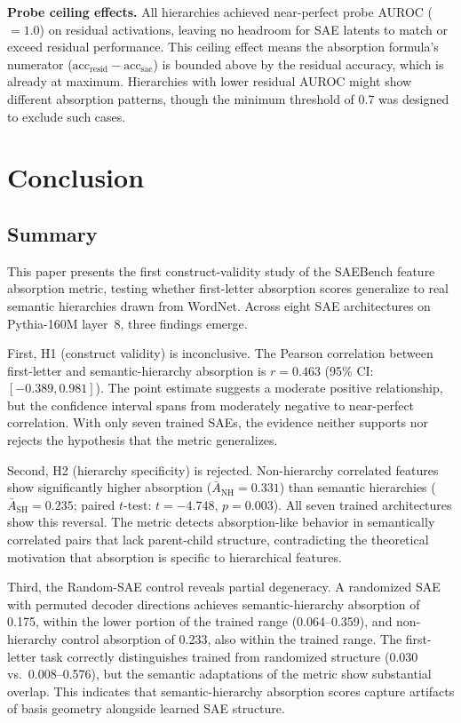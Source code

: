 \documentclass{article}
\begin{document}
\textbf{Probe ceiling effects.} All hierarchies achieved near-perfect probe AUROC ($= 1.0$) on residual activations, leaving no headroom for SAE latents to match or exceed residual performance. This ceiling effect means the absorption formula's numerator ($\text{acc}_{\text{resid}} - \text{acc}_{\text{sae}}$) is bounded above by the residual accuracy, which is already at maximum. Hierarchies with lower residual AUROC might show different absorption patterns, though the minimum threshold of 0.7 was designed to exclude such cases.

\section{Conclusion}

\subsection{Summary}

This paper presents the first construct-validity study of the SAEBench feature absorption metric, testing whether first-letter absorption scores generalize to real semantic hierarchies drawn from WordNet. Across eight SAE architectures on Pythia-160M layer~8, three findings emerge.

First, H1 (construct validity) is inconclusive. The Pearson correlation between first-letter and semantic-hierarchy absorption is $r = 0.463$ (95\% CI: $[-0.389, 0.981]$). The point estimate suggests a moderate positive relationship, but the confidence interval spans from moderately negative to near-perfect correlation. With only seven trained SAEs, the evidence neither supports nor rejects the hypothesis that the metric generalizes.

Second, H2 (hierarchy specificity) is rejected. Non-hierarchy correlated features show significantly higher absorption ($\bar{A}_{\text{NH}} = 0.331$) than semantic hierarchies ($\bar{A}_{\text{SH}} = 0.235$; paired $t$-test: $t = -4.748$, $p = 0.003$). All seven trained architectures show this reversal. The metric detects absorption-like behavior in semantically correlated pairs that lack parent-child structure, contradicting the theoretical motivation that absorption is specific to hierarchical features.

Third, the Random-SAE control reveals partial degeneracy. A randomized SAE with permuted decoder directions achieves semantic-hierarchy absorption of 0.175, within the lower portion of the trained range (0.064--0.359), and non-hierarchy control absorption of 0.233, also within the trained range. The first-letter task correctly distinguishes trained from randomized structure (0.030 vs.~0.008--0.576), but the semantic adaptations of the metric show substantial overlap. This indicates that semantic-hierarchy absorption scores capture artifacts of basis geometry alongside learned SAE structure.
\end{document}
